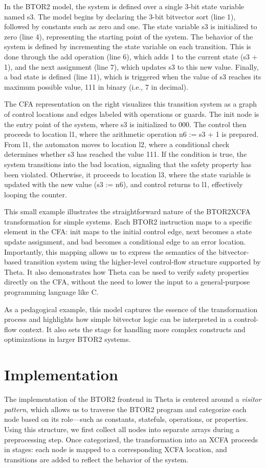 In the BTOR2 model, the system is defined over a single 3-bit state variable named s3. The model begins by declaring the 3-bit bitvector sort (line 1), followed by constants such as zero and one. The state variable s3 is initialized to zero (line 4), representing the starting point of the system. The behavior of the system is defined by incrementing the state variable on each transition. This is done through the add operation (line 6), which adds 1 to the current state (s3 + 1), and the next assignment (line 7), which updates s3 to this new value. Finally, a bad state is defined (line 11), which is triggered when the value of s3 reaches its maximum possible value, 111 in binary (i.e., 7 in decimal).

The CFA representation on the right visualizes this transition system as a graph of control locations and edges labeled with operations or guards. The init node is the entry point of the system, where s3 is initialized to 000. The control then proceeds to location l1, where the arithmetic operation n6 := s3 + 1 is prepared. From l1, the automaton moves to location l2, where a conditional check determines whether s3 has reached the value 111. If the condition is true, the system transitions into the bad location, signaling that the safety property has been violated. Otherwise, it proceeds to location l3, where the state variable is updated with the new value (s3 := n6), and control returns to l1, effectively looping the counter.

This small example illustrates the straightforward nature of the BTOR2XCFA transformation for simple systems. Each BTOR2 instruction maps to a specific element in the CFA: init maps to the initial control edge, next becomes a state update assignment, and bad becomes a conditional edge to an error location. Importantly, this mapping allows us to express the semantics of the bitvector-based transition system using the higher-level control-flow structure supported by Theta. It also demonstrates how Theta can be used to verify safety properties directly on the CFA, without the need to lower the input to a general-purpose programming language like C.

As a pedagogical example, this model captures the essence of the transformation process and highlights how simple bitvector logic can be interpreted in a control-flow context. It also sets the stage for handling more complex constructs and optimizations in larger BTOR2 systems.

\section{Implementation}
The implementation of the BTOR2 frontend in Theta is centered around a \textit{visitor pattern}, which allows us to traverse the BTOR2 program and categorize each node based on its role—such as constants, statefuls, operations, or properties. Using this structure, we first collect all nodes into separate arrays during a preprocessing step. Once categorized, the transformation into an XCFA proceeds in stages: each node is mapped to a corresponding XCFA location, and transitions are added to reflect the behavior of the system.

